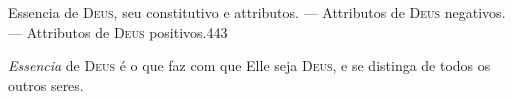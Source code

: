 %

%
  {Essencia de \textsc{Deus}, seu constitutivo e attributos. --- Attributos de
   \textsc{Deus} negativos. --- Attributos de \textsc{Deus} positivos.}{443}


 \emph{Essencia} de \textsc{Deus} é o que faz com que Elle
seja \textsc{Deus}, e se distinga de todos os outros seres.

